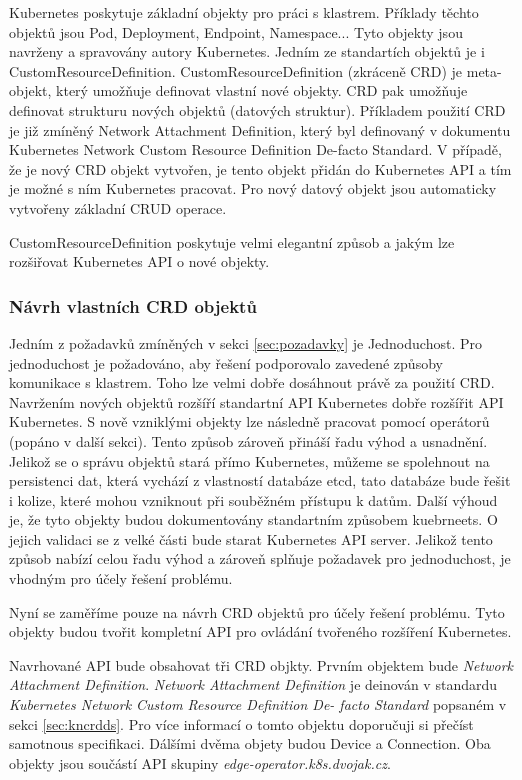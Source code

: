 Kubernetes poskytuje základní objekty pro práci s klastrem. Příklady těchto objektů jsou Pod, Deployment, Endpoint, Namespace... Tyto objekty jsou navrženy a spravovány autory Kubernetes. Jedním ze standartích objektů je i CustomResourceDefinition. CustomResourceDefinition (zkráceně CRD) je meta-objekt, který umožňuje definovat vlastní nové objekty. CRD pak umožňuje definovat strukturu nových objektů (datových struktur). Příkladem použití CRD je již zmíněný Network Attachment Definition, který byl definovaný v dokumentu Kubernetes Network Custom Resource Definition De-facto Standard. V případě, že je nový CRD objekt vytvořen, je tento objekt přidán do Kubernetes API a tím je možné s ním Kubernetes pracovat. Pro nový datový objekt jsou automaticky vytvořeny základní CRUD operace.

CustomResourceDefinition poskytuje velmi elegantní způsob a jakým lze rozšiřovat Kubernetes API o nové objekty.  
\subsubsection{Návrh vlastních CRD objektů}
Jedním z požadavků zmíněných v sekci \ref{sec:pozadavky} je Jednoduchost. Pro jednoduchost je požadováno, aby řešení podporovalo zavedené způsoby komunikace s klastrem. Toho lze velmi dobře dosáhnout právě za použití CRD. Navržením nových objektů rozšíří standartní API Kubernetes dobře rozšířit API Kubernetes. S nově vzniklými objekty lze následně pracovat pomocí operátorů (popáno v další sekci). Tento způsob zároveň přináší řadu výhod a usnadnění. Jelikož se o správu objektů stará přímo Kubernetes, můžeme se spolehnout na persistenci dat, která vychází z vlastností databáze etcd, tato databáze bude řešit i kolize, které mohou vzniknout při souběžném přístupu k datům. Další výhoud je, že tyto objekty budou dokumentovány standartním způsobem kuebrneets. O jejich validaci se z velké části bude starat Kubernetes API server. Jelikož tento způsob nabízí celou řadu výhod a zároveň splňuje požadavek pro jednoduchost, je vhodným pro účely řešení problému.

Nyní se zaměříme pouze na návrh CRD objektů pro účely řešení problému. Tyto objekty budou tvořit kompletní API pro ovládání tvořeného rozšíření Kubernetes.

Navrhované API bude obsahovat tři CRD objkty. Prvním objektem bude \textit{Network Attachment Definition}. \textit{Network Attachment Definition} je deinován v standardu \textit{Kubernetes Network Custom Resource Definition De-
facto Standard} popsaném v sekci \ref{sec:kncrdds}. Pro více informací o tomto objektu doporučuji si přečíst samotnous specifikaci. Dálšími dvěma objety budou Device a Connection. Oba objekty jsou součástí API skupiny \textit{edge-operator.k8s.dvojak.cz}.  
